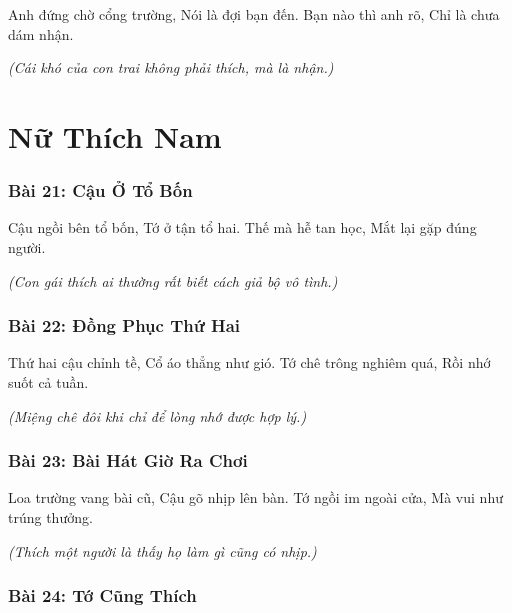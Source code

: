 \documentclass[14pt,a4paper,twoside]{extbook}
\begin{document}
Anh đứng chờ cổng trường,
Nói là đợi bạn đến.
Bạn nào thì anh rõ,
Chỉ là chưa dám nhận.

\vspace{1.5cm}\noindent
\textit{(Cái khó của con trai không phải thích, mà là nhận.)}

\newpage

\part{Nữ Thích Nam}

\section*{Bài 21: Cậu Ở Tổ Bốn}

Cậu ngồi bên tổ bốn,
Tớ ở tận tổ hai.
Thế mà hễ tan học,
Mắt lại gặp đúng người.

\vspace{1.5cm}\noindent
\textit{(Con gái thích ai thường rất biết cách giả bộ vô tình.)}

\vspace{2cm}

\section*{Bài 22: Đồng Phục Thứ Hai}

Thứ hai cậu chỉnh tề,
Cổ áo thẳng như gió.
Tớ chê trông nghiêm quá,
Rồi nhớ suốt cả tuần.

\vspace{1.5cm}\noindent
\textit{(Miệng chê đôi khi chỉ để lòng nhớ được hợp lý.)}

\vspace{2cm}

\section*{Bài 23: Bài Hát Giờ Ra Chơi}

Loa trường vang bài cũ,
Cậu gõ nhịp lên bàn.
Tớ ngồi im ngoài cửa,
Mà vui như trúng thưởng.

\vspace{1.5cm}\noindent
\textit{(Thích một người là thấy họ làm gì cũng có nhịp.)}

\vspace{2cm}

\section*{Bài 24: Tớ Cũng Thích}
\end{document}
